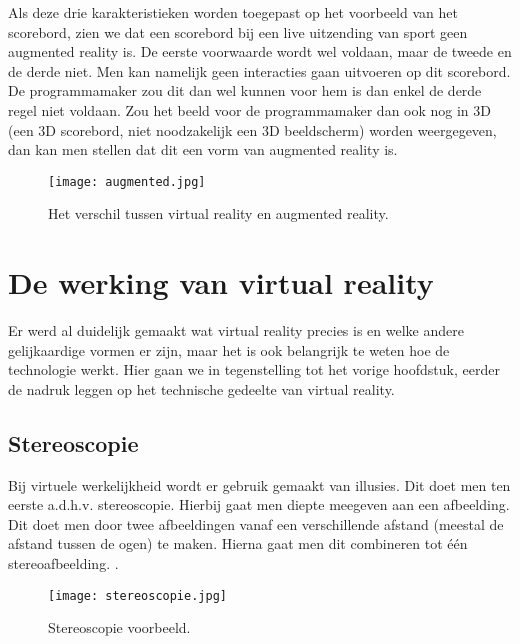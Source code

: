 Als deze drie karakteristieken worden toegepast op het voorbeeld van het scorebord, zien we dat een scorebord bij een live uitzending van sport geen augmented reality is. De eerste voorwaarde wordt wel voldaan, maar de tweede en de derde niet. Men kan namelijk geen interacties gaan uitvoeren op dit scorebord. De programmamaker zou dit dan wel kunnen voor hem is dan enkel de derde regel niet voldaan. Zou het beeld voor de programmamaker dan ook nog in 3D (een 3D scorebord, niet noodzakelijk een 3D beeldscherm) worden weergegeven, dan kan men stellen dat dit een vorm van augmented reality is.

\begin{figure}[h]
	\centering
	\texttt{[image: augmented.jpg]}
	\caption{Het verschil tussen virtual reality en augmented reality.}
	\label{fig:augmented}
\end{figure}

\section{De werking van virtual reality}
\label{sec:hoe-werkt-vr}
Er werd al duidelijk gemaakt wat virtual reality precies is en welke andere gelijkaardige vormen er zijn, maar het is ook belangrijk te weten hoe de technologie werkt. Hier gaan we in tegenstelling tot het vorige hoofdstuk, eerder de nadruk leggen op het technische gedeelte van virtual reality.

\subsection{Stereoscopie}
\label{subsec:stereoscopie}
Bij virtuele werkelijkheid wordt er gebruik gemaakt van illusies. Dit doet men ten eerste a.d.h.v. stereoscopie. Hierbij gaat men diepte meegeven aan een afbeelding. Dit doet men door twee afbeeldingen vanaf een verschillende afstand (meestal de afstand tussen de ogen) te maken. Hierna gaat men dit combineren tot één stereoafbeelding. \autocite{Rouse2011}.

\begin{figure}
	\centering
	\texttt{[image: stereoscopie.jpg]}
	\caption{Stereoscopie voorbeeld.}
	\label{fig:stereoscopie}
\end{figure}

